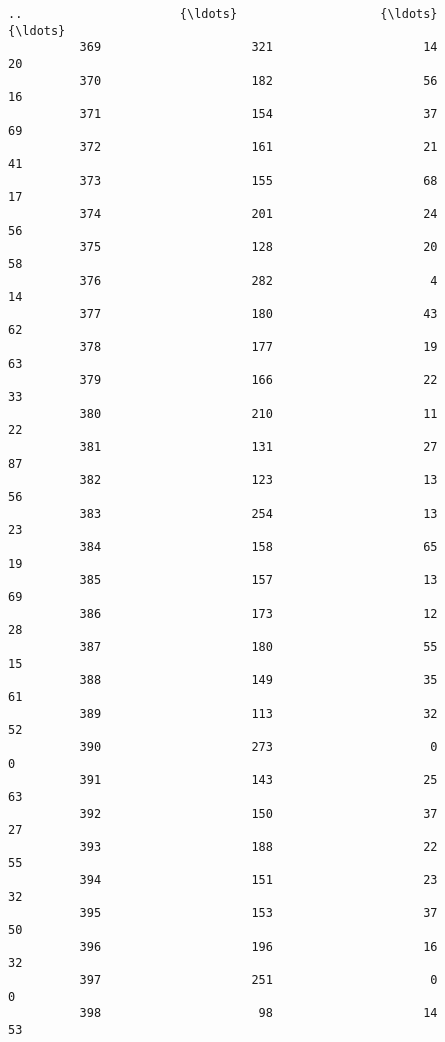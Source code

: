 \documentclass[11pt]{article}
\begin{document}
\begin{Verbatim}[commandchars=\\\{\}]
          ..                      {\ldots}                    {\ldots}                  {\ldots}   
          369                     321                     14                   20   
          370                     182                     56                   16   
          371                     154                     37                   69   
          372                     161                     21                   41   
          373                     155                     68                   17   
          374                     201                     24                   56   
          375                     128                     20                   58   
          376                     282                      4                   14   
          377                     180                     43                   62   
          378                     177                     19                   63   
          379                     166                     22                   33   
          380                     210                     11                   22   
          381                     131                     27                   87   
          382                     123                     13                   56   
          383                     254                     13                   23   
          384                     158                     65                   19   
          385                     157                     13                   69   
          386                     173                     12                   28   
          387                     180                     55                   15   
          388                     149                     35                   61   
          389                     113                     32                   52   
          390                     273                      0                    0   
          391                     143                     25                   63   
          392                     150                     37                   27   
          393                     188                     22                   55   
          394                     151                     23                   32   
          395                     153                     37                   50   
          396                     196                     16                   32   
          397                     251                      0                    0   
          398                      98                     14                   53   
          

\end{Verbatim}
\end{document}
